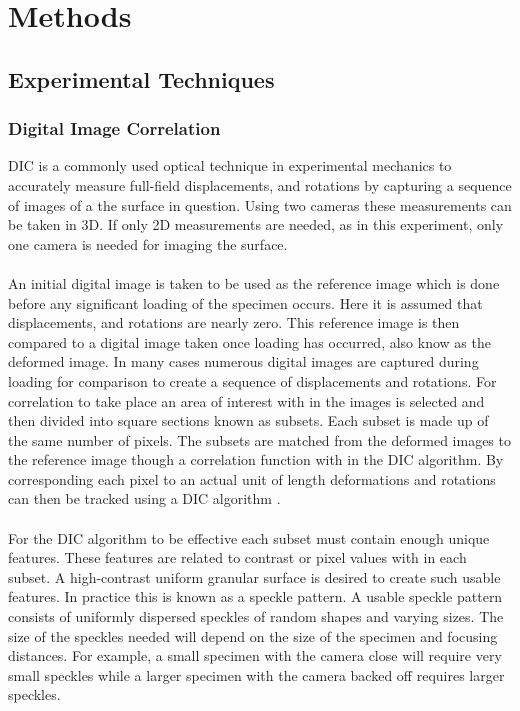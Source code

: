 \documentclass[12pt]{article}
\begin{document}
\section{Methods}

\subsection{Experimental Techniques} 

\subsubsection{Digital Image Correlation} %
DIC is a commonly used optical technique in experimental mechanics to accurately measure full-field displacements, and rotations by capturing a sequence of images of a the surface in question. Using two cameras these measurements can be taken in 3D. If only 2D measurements are needed, as in this experiment, only one camera is needed for imaging the surface.
\\
\\
An initial digital image is taken to be used as the reference image which is done before any significant loading of the specimen occurs. Here it is assumed that displacements, and rotations are nearly zero.  This reference image is then compared to a digital image taken once loading has occurred, also know as the deformed image. In many cases numerous digital images are captured during loading for comparison to create a sequence of displacements and rotations.  For correlation to take place an area of interest with in the images is selected and then divided into square sections known as subsets. Each subset is made up of the same number of pixels.  The subsets are matched from the deformed images to the reference image though a correlation function with in the DIC algorithm. By corresponding each pixel to an actual unit of length deformations and rotations can then be tracked using a DIC algorithm \cite{DIC}.
\\
\\
For the DIC algorithm to be effective each subset must contain enough unique features.  These features are related to contrast or pixel values with in each subset. A high-contrast uniform granular  surface is desired to create such usable features. In practice this is known as a speckle pattern. A usable speckle pattern consists of uniformly dispersed speckles of  random shapes and varying sizes. The size of the speckles needed will depend on the size of the specimen and focusing distances. For example, a small specimen with the camera close will require very small speckles while a larger specimen with the camera backed off requires larger speckles. 
\end{document}
